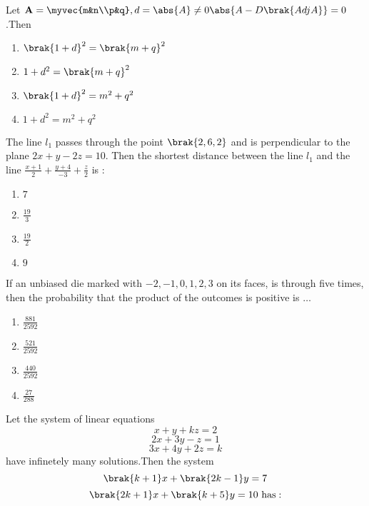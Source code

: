 \iffalse
\title{2023}
\author{EE24BTECH11008}
\section{mcq-single}
\fi
    \item Let $\textbf{A}=\myvec{m&n\\p&q},d=\abs{A} \neq 0 \abs{A-D\brak{Adj A}}=0$.Then 
	    \hfill{}\\
    \begin{enumerate}
        \item $\brak{1+d}^2=\brak{m+q}^2$
        \item $1+d^2=\brak{m+q}^2$
        \item $\brak{1+d}^2=m^2+q^2$
        \item $1+d^2=m^2+q^2$
    \end{enumerate}
    \item The line $l_1$ passes through the point $\brak{2,6,2}$ and is perpendicular to the plane $2x+y-2z=10.$ Then the shortest distance between the line $l_1$ and the line $\frac{x+1}{2}+\frac{y+4}{-3}+\frac{z}{2}$ is $:$\hfill{}\\
    \begin{enumerate}
        \item $7$
        \item $\frac{19}{3}$
        \item $\frac{19}{2}$
        \item $9$
    \end{enumerate}
    \item If an unbiased die marked with $-2,-1,0,1,2,3$ on its faces, is through five times, then the probability that the product of the outcomes is positive is $\dots$\hfill{}\\
    \begin{enumerate}
        \item $\frac{881}{2592}$
        \item $\frac{521}{2592}$
        \item $\frac{440}{2592}$
        \item $\frac{27}{288}$
    \end{enumerate}
    \item Let the system of linear equations $$x+y+kz=2$$ $$2x+3y-z=1$$ $$3x+4y+2z=k$$ have infinetely many solutions.Then the system $$\brak{k+1}x+\brak{2k-1}y=7$$ $$\brak{2k+1}x+\brak{k+5}y=10 \text{ has}: $$\hfill{}\\
